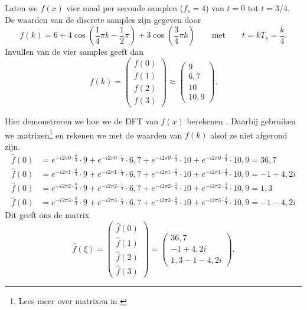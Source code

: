 \documentclass[11pt,fleqn]{book} %
\begin{document}
Laten we $f(x)$ vier maal per seconde samplen ($f_s=4$) van $t=0$ tot $t=3/4$. De waarden van de discrete samples zijn gegeven door
\begin{displaymath}
f(k)=6+4\cos{\left(\frac{1}{4}\pi k -\frac{1}{2}\pi\right)}+3\cos{\left(\frac{3}{4}\pi k\right)}\qquad\text{met}\qquad t=kT_s=\frac{k}{4}.
\end{displaymath}
Invullen van de vier samples geeft dan
\begin{displaymath}
f(k)=\begin{pmatrix}f(0)\\f(1)\\f(2)\\f(3)\end{pmatrix}\approx \begin{pmatrix}9\\6,7\\10\\10,9\end{pmatrix}.
\end{displaymath}

Hier demonstreren we hoe we de DFT van $f(x)$ berekenen \cite{sr}. Daarbij gebruiken we matrixen\footnote{Lees meer over matrixen in \cite{mat}} en rekenen we met de waarden van $f(k)$ alsof ze niet afgerond zijn.
\begin{displaymath}
\begin{aligned}
\hat{f}(0)&=e^{-i2\pi 0\cdot\frac{0}{4}}\cdot 9+e^{-i2\pi 0\cdot\frac{1}{4}}\cdot 6,7+e^{-i2\pi 0\cdot\frac{2}{4}}\cdot 10+e^{-i2\pi 0\cdot\frac{3}{4}}\cdot 10,9=36,7\\
\hat{f}(0)& =e^{-i2\pi 1\cdot\frac{0}{4}}\cdot 9+e^{-i2\pi 1\cdot\frac{1}{4}}\cdot 6,7+e^{-i2\pi 1\cdot\frac{2}{4}}\cdot 10+e^{-i2\pi 1\cdot\frac{3}{4}}\cdot 10,9=-1+4,2i\\
\hat{f}(0)& =e^{-i2\pi 2\cdot\frac{0}{4}}\cdot 9+e^{-i2\pi 2\cdot\frac{1}{4}}\cdot 6,7+e^{-i2\pi 2\cdot\frac{2}{4}}\cdot 10+e^{-i2\pi 2\cdot\frac{3}{4}}\cdot 10,9=1,3\\
\hat{f}(0)& =e^{-i2\pi 3\cdot\frac{0}{4}}\cdot 9+e^{-i2\pi 3\cdot\frac{1}{4}}\cdot 6,7+e^{-i2\pi 3\cdot\frac{2}{4}}\cdot 10+e^{-i2\pi 3\cdot\frac{3}{4}}\cdot 10,9=-1-4,2i
\end{aligned}
\end{displaymath}
Dit geeft ons de matrix
\begin{displaymath}
\hat{f}(\xi)=\begin{pmatrix}\hat{f}(0)\\\hat{f}(1)\\\hat{f}(2)\\\hat{f}(3)\end{pmatrix}=\begin{pmatrix}36,7\\-1+4,2i\\1,3-1-4,2i\end{pmatrix}.
\end{displaymath}
\end{document}
